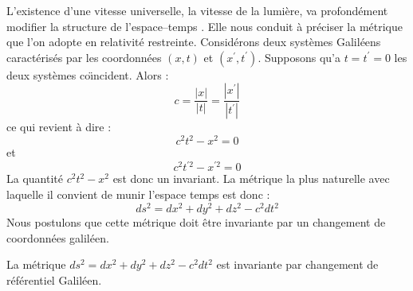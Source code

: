 \documentclass[12pt]{book}
\begin{document}
L'existence d'une vitesse universelle, la vitesse de la lumi\`ere, va
profond\'ement modifier la structure de l'espace--temps
. Elle nous conduit \`a
pr\'eciser la m\'etrique que l'on adopte en relativit\'e restreinte.
Consid\'erons deux syst\`emes Galil\'eens caract\'eris\'es par les
coordonn\'ees 
$(x,t)$ et  $(x^\prime,t^\prime)$. Supposons qu'a $t=t^\prime=0$ les
deux syst\`emes co\"\i ncident. Alors :
\begin{equation}
c=\frac{|x|}{|t|}=\frac{|x^\prime|}{|t^\prime|}
\end{equation}
ce qui revient \`a dire :
\begin{equation}
c^2t^2-x^2=0
\end{equation}
et
\begin{equation}
c^2t^{\prime 2}-x^{\prime 2}=0
\end{equation}
La quantit\'e $c^2t^2-x^2$ est donc un invariant.
La m\'etrique la plus naturelle avec laquelle il convient de munir
l'espace temps est donc :
\begin{equation}
ds^2=dx^2+dy^2+dz^2-c^2dt^2
\end{equation}
Nous postulons que cette m\'etrique doit \^etre invariante par un
changement de coordonn\'ees galil\'een.
\begin{postulat}
La m\'etrique $ds^2=dx^2+dy^2+dz^2-c^2dt^2$ est invariante par
changement de r\'ef\'erentiel Galil\'een.
\end{postulat}
\end{document}
